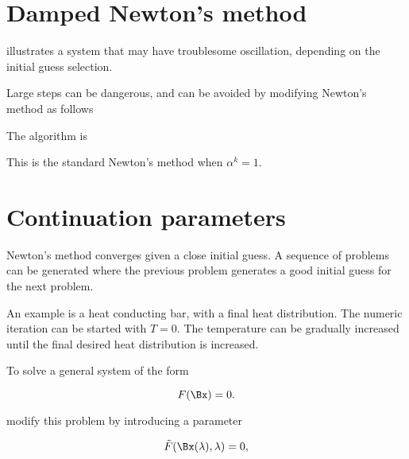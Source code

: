 %
%

\section{Damped Newton's method}

 illustrates a system that may have troublesome oscillation, depending on the initial guess selection.



Large steps can be dangerous, and can be avoided by modifying Newton's method as follows

The algorithm is

This is the standard Newton's method when \( \alpha^k = 1 \).

\section{Continuation parameters}

Newton's method converges given a close initial guess.  A sequence of problems can be generated where the previous problem generates a good initial guess for the next problem.

An example is a heat conducting bar, with a final heat distribution.  The numeric iteration can be started with \( T = 0 \).  The temperature can be gradually increased until the final desired heat distribution is increased.

To solve a general system of the form

\begin{equation}\label{eqn:multiphysicsL12:340}
F(\Bx) = 0.
\end{equation}

modify this problem by introducing a parameter

\begin{equation}\label{eqn:multiphysicsL12:360}
\tilde{F}(\Bx(\lambda), \lambda) = 0,
\end{equation}


